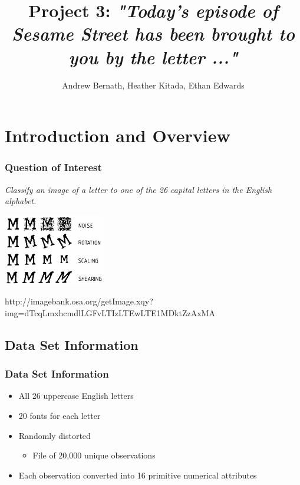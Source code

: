 \documentclass{beamer}
\title{Project 3: \emph{"Today's episode of Sesame Street has been brought to you by the letter ..."} }
\author{Andrew Bernath, Heather Kitada, Ethan Edwards}
\institute{Oregon State University}
\begin{document}
\begin{frame}
\titlepage
\end{frame}



\begin{frame}{\contentsname}
\begin{multicols}{2}
\tableofcontents
\end{multicols}
\end{frame}

\section{Introduction and Overview}
\begin{frame}
\frametitle{Question of Interest}
\large{\emph{Classify an image of a letter to one of the 26 capital letters in the English alphabet.}}

\begin{center} 
\includegraphics[width=.6 \textwidth]{letterDistortion}

\tiny{http://imagebank.osa.org/getImage.xqy?img=dTcqLmxhcmdlLGFvLTIzLTEwLTE1MDktZzAxMA}
\end{center}
\end{frame}

\subsection{Data Set Information}
\begin{frame}
\frametitle{Data Set Information}
\begin{itemize}
\item All 26 uppercase English letters 
\item 20 fonts for each letter 
\item Randomly distorted 
\begin{itemize}
\item File of 20,000 unique observations
\end{itemize}
\item Each observation converted into 16 primitive numerical attributes 
\end{itemize}
\end{frame}
\end{document}
